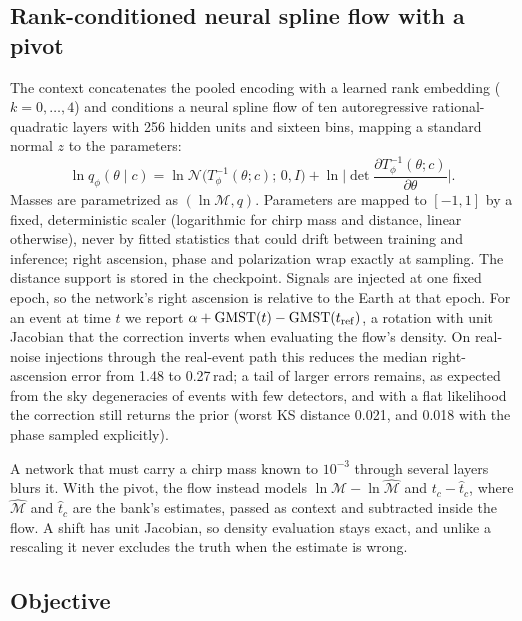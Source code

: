 \documentclass[twocolumn,linenumbers]{aastex701}
\begin{document}
\subsection{Rank-conditioned neural spline flow with a pivot}

The context concatenates the pooled encoding with a learned rank embedding
($k=0,\dots,4$) and conditions a neural spline flow \citep{Durkan2019Nsf,
nflows} of ten autoregressive rational-quadratic layers with 256 hidden units
and sixteen bins, mapping a standard normal $z$ to the parameters:
\begin{equation}
\ln q_\phi(\theta \mid c) = \ln \mathcal{N}\!\big(T_\phi^{-1}(\theta;c);\,0,I\big) + \ln\Big|\det \frac{\partial T_\phi^{-1}(\theta;c)}{\partial\theta}\Big|.
\label{eq:flowdensity}
\end{equation}
Masses are parametrized as $(\ln\mathcal{M}, q)$. Parameters are mapped to
$[-1,1]$ by a fixed, deterministic scaler (logarithmic for chirp mass and
distance, linear otherwise), never by fitted statistics that could drift
between training and inference; right ascension, phase and polarization wrap
exactly at sampling. The distance support is stored in the checkpoint.
Signals are injected at one fixed epoch, so the network's right ascension is
relative to the Earth at that epoch. For an event at time $t$ we report
$\alpha + {\rm GMST}(t) - {\rm GMST}(t_{\rm ref})$, a rotation with unit Jacobian
that the correction inverts when evaluating the flow's density. On real-noise
injections through the real-event path this reduces the median right-ascension
error from 1.48 to 0.27\,rad; a tail of larger errors remains, as expected from the
sky degeneracies of events with few detectors,
and with a flat likelihood the correction still returns the prior (worst KS
distance 0.021, and 0.018 with the phase sampled explicitly).

A network that must carry a chirp mass known to $10^{-3}$ through several
layers blurs it. With the pivot, the flow instead models
$\ln\mathcal{M}-\ln\hat{\mathcal{M}}$ and $t_c-\hat t_c$, where $\hat{\mathcal
M}$ and $\hat t_c$ are the bank's estimates, passed as context and subtracted
inside the flow. A shift has unit Jacobian, so density evaluation stays exact,
and unlike a rescaling it never excludes the truth when the estimate is wrong.

\subsection{Objective}
\end{document}
